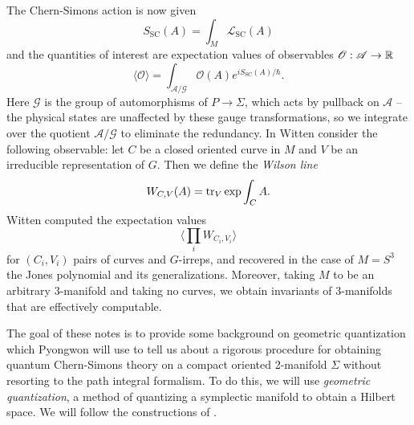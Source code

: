 \documentclass{amsart}
\begin{document}
The Chern-Simons action is now given
\begin{equation*}
    S_\text{SC}(A) = \int_M \mathscr{L}_\text{SC}(A)
\end{equation*}
and the quantities of interest are expectation values of observables $\mathscr{O}:\mathscr{A}\to\mathbb{R}$
\begin{equation*}
    \langle\mathscr{O}\rangle = \int_{\mathscr{A}/\mathscr{G}} \mathscr{O}(A) e^{iS_\text{SC}(A)/\hbar}.
\end{equation*}
Here $\mathscr{G}$ is the group of automorphisms of $P\to\Sigma$, which acts by pullback on
$\mathscr{A}$ -- the physical states are unaffected by these gauge transformations, so we integrate
over the quotient $\mathscr{A}/\mathscr{G}$ to eliminate the redundancy.
In \cite{witten} Witten consider the following observable: let $C$ be a closed oriented curve
in $M$ and $V$ be an irreducible representation of $G$. Then we define the \textit{Wilson line}
\begin{equation*}
    W_{C,V}(A) = \operatorname{tr}_V \exp\int_C A.
\end{equation*}
Witten computed the expectation values
\begin{equation*}
    \langle \prod_i W_{C_i,V_i}\rangle
\end{equation*}
for $(C_i,V_i)$ pairs of curves and $G$-irreps, and recovered in the case of $M=S^3$ the Jones
polynomial and its generalizations. Moreover, taking $M$ to be an arbitrary 3-manifold and taking
no curves, we obtain invariants of 3-manifolds that are effectively computable.

The goal of these notes is to provide some background on geometric quantization which Pyongwon
will use to tell us about a rigorous procedure for obtaining quantum Chern-Simons theory
on a compact oriented 2-manifold $\Sigma$
without resorting to the path integral formalism. To do this, we will use \textit{geometric quantization},
a method of quantizing a symplectic manifold to obtain a Hilbert space. We will follow the constructions
of \cite{gq}.
\end{document}
